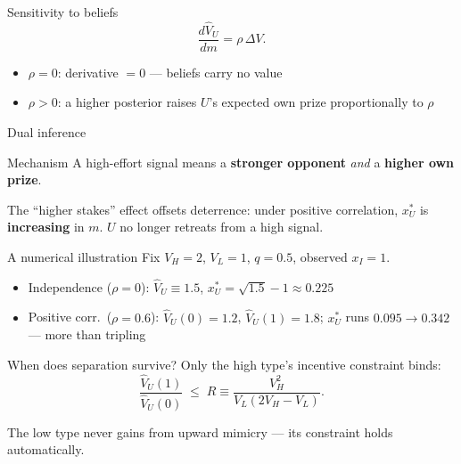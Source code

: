 \documentclass[10pt]{beamer}
\newcommand{\Vhat}{\widehat{V}_U}
\begin{document}
\begin{frame}{Sensitivity to beliefs}
  \begin{equation}
    \dfrac{d\Vhat}{dm} = \rho\,\Delta V.
  \end{equation}

  \begin{itemize}
    \item $\rho = 0$: derivative $= 0$ --- beliefs carry no value
    \item $\rho > 0$: a higher posterior raises $U$'s expected own prize
          proportionally to $\rho$
  \end{itemize}
\end{frame}

\begin{frame}{Dual inference}
  \begin{alertblock}{Mechanism}
    A high-effort signal means a \textbf{stronger opponent}
    \emph{and} a \textbf{higher own prize}.
  \end{alertblock}

  The ``higher stakes'' effect offsets deterrence: under positive
  correlation, $x_U^{*}$ is \textbf{increasing} in $m$. $U$ no longer
  retreats from a high signal.
\end{frame}

\begin{frame}{A numerical illustration}
  Fix $V_H=2$, $V_L=1$, $q=0.5$, observed $x_I=1$.
  \begin{itemize}
    \item Independence ($\rho=0$): $\Vhat\equiv 1.5$,
          $x_U^{*}=\sqrt{1.5}-1\approx 0.225$
    \item Positive corr.\ ($\rho=0.6$): $\Vhat(0)=1.2$, $\Vhat(1)=1.8$;
          $x_U^{*}$ runs $0.095 \to 0.342$ --- more than tripling
  \end{itemize}
\end{frame}

\begin{frame}{When does separation survive?}
  Only the high type's incentive constraint binds:
  \begin{equation}
    \dfrac{\Vhat(1)}{\Vhat(0)} \;\le\; R
    \equiv \dfrac{V_H^2}{V_L(2V_H - V_L)}.
  \end{equation}

  The low type never gains from upward mimicry --- its constraint holds
  automatically.
\end{frame}
\end{document}
